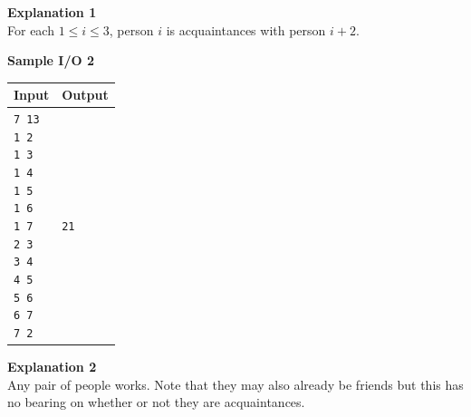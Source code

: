 \documentclass{article}
\begin{document}
{\noindent \bf Explanation 1}\\
For each $1 \leq i \leq 3$, person $i$ is acquaintances with person $i + 2$. \newline

{\pagebreak \noindent \bf Sample I/O 2}\\
\begin{tabular}{|p{}|p{}|}
    \hline
    \textbf{Input} & \textbf{Output}\\
    \hline
    \texttt{7 13 \newline 1 2 \newline 1 3 \newline 1 4 \newline 1 5 \newline 1 6 \newline 1 7 \newline 2 3 \newline 3 4 \newline 4 5 \newline 5 6 \newline 6 7 \newline 7 2}
    &
    \texttt{21}\\
    \hline
\end{tabular} \newline \newline

{\noindent \bf Explanation 2}\\
Any pair of people works. Note that they may also already be friends but this has no bearing on whether or not they are acquaintances.
\end{document}
